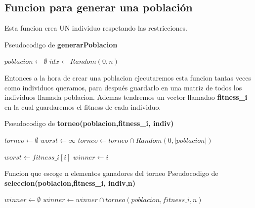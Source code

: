 \subsection{Funcion para generar una población}

Esta funcion crea UN individuo respetando las restricciones.

Pseudocodigo de \textbf{generarPoblacion}
\begin{algorithm}[H]
  \begin{algorithmic}[1]
      \State $poblacion \gets \emptyset $
       
        \State $idx \gets Random(0,n)$ 
      \EndWhile
      \State {}
    \EndFunction
  \end{algorithmic}
\end{algorithm}

Entonces a la hora de crear una poblacion ejecutaremos esta funcion tantas veces como individuos queramos, para después
guardarlo en una matriz de todos los individuos llamada poblacion.
Ademas tendremos un vector llamadao \textbf{fitness\_i} en la cual guardaremos el fitness de cada individuo.

Pseudocodigo de \textbf{torneo(poblacion,fitness\_i, indiv)}
\begin{algorithm}[H]
  \begin{algorithmic}[1]
      \State $torneo \gets \emptyset $
      \State $worst \gets \infty$
       
        \State $torneo \gets torneo \cap Random(0,|poblacion|)$ 

      \EndWhile
          \State $worst \gets fitness\_i[i] $
          \State $winner \gets i$
        \EndIf
      \EndFor
      \State {}
    \EndFunction
  \end{algorithmic}
\end{algorithm}

Funcion que escoge n elementos ganadores del torneo
Pseudocodigo de \textbf{seleccion(poblacion,fitness\_i, indiv,n)}
\begin{algorithm}[H]
  \begin{algorithmic}[1]
      \State $winner \gets \emptyset $
          \State $winner \gets winner \cap torneo(poblacion,fitness\_i,n)$
      \EndFor
      \State {}
    \EndFunction
  \end{algorithmic}
\end{algorithm}

